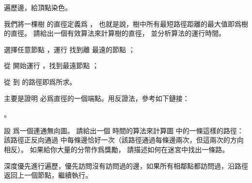 \startANSWER
遍歷邊，給頂點染色。
\stopANSWER

\startEXERCISE\DIFFICULT
我們將一棵樹  的{\EMP 直徑}定義爲 ，
也就是說，樹中所有最短路徑距離的最大值即爲樹的直徑。
請給出一個有效算法來計算樹的直徑，
並分析算法的運行時間。
\stopEXERCISE

\startANSWER
\startigBase[n]
\item 選擇任意節點 ，運行  找到離  最遠的節點 ；
\item 從  開始運行 ，找到最遠節點 ；
\item 從  到  的路徑即爲所求。
\stopigBase

主要是證明  必爲直徑的一個端點。用反證法，參考如下鏈接：

。
\stopANSWER

\startEXERCISE
設  爲一個連通無向圖。
請給出一個  時間的算法來計算圖  中的一條這樣的路徑：
該路徑正反向通過  中每條邊恰好一次（該路徑通過每條邊兩次，但這兩次的方向相反）。
如果給你大量的分幣作爲獎勵，
請描述如何在迷宮中找出一條路。
\stopEXERCISE

\startANSWER
深度優先進行遍歷，優先訪問沒有訪問過的邊，如果所有相鄰點都訪問過，沿路徑返回上一個節點，繼續執行。
\stopANSWER

\stopsection
